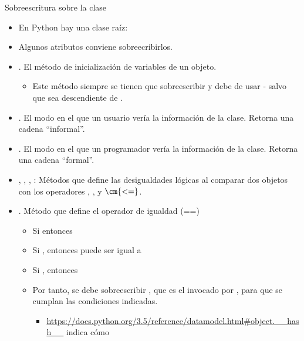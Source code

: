 \documentclass[10pt,envcountsect,spanish]{beamer}
\begin{document}
\begin{frame}[fragile]{Sobreescritura  sobre la clase }

\begin{itemize}
\item En Python hay una clase raíz: 
\item Algunos atributos   conviene sobreecribirlos. %

\item {}. El método de inicialización de variables de un objeto.

\begin{itemize}
\item Este método siempre se tienen que sobreescribir y debe de usar  - salvo que sea descendiente de .
\end{itemize}


\item {}. El modo en el que un usuario vería la información de la clase. Retorna una cadena ``informal''.

\item {}. El modo en el que un programador vería la información de la clase. Retorna una cadena ``formal''.

\item {}, , , : Métodos que define las desigualdades lógicas al comparar dos objetos con los operadores \cm{$>$}, \cm{$>=$}, \cm{$<$} y $\cm{<=}$.

\item {}. Método que define el operador de igualdad (==)

\begin{itemize}
\item Si  entonces 
\item Si , entonces  puede ser igual a 
\item Si , entonces 
\item Por tanto, se debe sobreescribir , que es el invocado por , para que se cumplan las condiciones indicadas.
	\begin{itemize}
	\item {\scriptsize \url{https://docs.python.org/3.5/reference/datamodel.html#object.__hash__}} indica cómo
	\end{itemize}
\end{itemize}


\end{itemize}
\end{frame}
\end{document}
